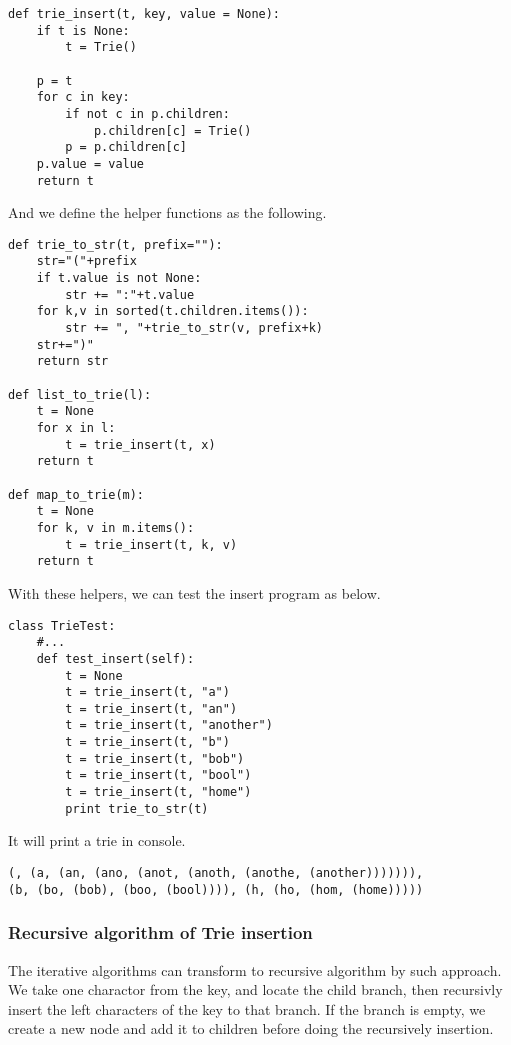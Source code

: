 \documentclass{article}
\begin{document}
\lstset{language=Python}
\begin{lstlisting}
def trie_insert(t, key, value = None):
    if t is None:
        t = Trie()

    p = t
    for c in key:
        if not c in p.children: 
            p.children[c] = Trie()
        p = p.children[c]
    p.value = value
    return t
\end{lstlisting}

And we define the helper functions as the following.

\begin{lstlisting}
def trie_to_str(t, prefix=""):
    str="("+prefix
    if t.value is not None:
        str += ":"+t.value
    for k,v in sorted(t.children.items()):
        str += ", "+trie_to_str(v, prefix+k)
    str+=")"
    return str

def list_to_trie(l):
    t = None
    for x in l:
        t = trie_insert(t, x)
    return t

def map_to_trie(m):
    t = None
    for k, v in m.items():
        t = trie_insert(t, k, v)
    return t
\end{lstlisting}

With these helpers, we can test the insert program as below.

\begin{lstlisting}
class TrieTest:
    #...
    def test_insert(self):
        t = None
        t = trie_insert(t, "a")
        t = trie_insert(t, "an")
        t = trie_insert(t, "another")
        t = trie_insert(t, "b")
        t = trie_insert(t, "bob")
        t = trie_insert(t, "bool")
        t = trie_insert(t, "home")
        print trie_to_str(t)
\end{lstlisting}

It will print a trie in console.

\begin{verbatim}
(, (a, (an, (ano, (anot, (anoth, (anothe, (another))))))), 
(b, (bo, (bob), (boo, (bool)))), (h, (ho, (hom, (home)))))
\end{verbatim}

\subsubsection {Recursive algorithm of Trie insertion}

The iterative algorithms can transform to recursive algorithm by such
approach. We take one charactor from
the key, and locate the child branch, then recursivly insert the left
characters of the key to that branch. If the branch is empty, we
create a new node and add it to children before doing the recursively insertion.
\end{document}
